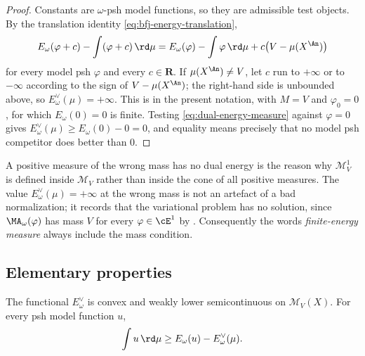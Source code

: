 \begin{proof}
Constants are $\omega$-psh model functions, so they are admissible test
objects.  By the translation identity \eqref{eq:bfj-energy-translation},
\begin{equation}
\label{eq:dual-energy-constant-test}
 E_\omega(\varphi+c)-\int(\varphi+c)\,\rd \mu
 =E_\omega(\varphi)-\int\varphi\,\rd \mu
   +c\bigl(V-\mu(X^{\An})\bigr)
\end{equation}
for every model psh $\varphi$ and every $c\in\mathbf R$.  If
$\mu(X^{\An})\neq V$, let $c$ run to $+\infty$ or to $-\infty$
according to the sign of $V-\mu(X^{\An})$; the right-hand side is
unbounded above, so $E^\vee_\omega(\mu)=+\infty$.  This is
 in the present notation, with $M=V$ and
$\varphi_0=0$, for which $E_\omega(0)=0$ is finite.  Testing
\eqref{eq:dual-energy-measure} against $\varphi=0$ gives
$E^\vee_\omega(\mu)\geq E_\omega(0)-0=0$, and equality means precisely that
no model psh competitor does better than $0$.
\end{proof}

\begin{warning}{A positive measure of the wrong mass has no dual energy}
 is the reason why $\mathcal M^1_V$ is defined
inside $\mathcal M_V$ rather than inside the cone of all positive
measures.  The value $E^\vee_\omega(\mu)=+\infty$ at the wrong mass is not
an artefact of a bad normalization; it records that the variational problem
has no solution, since $\MA_\omega(\varphi)$ has mass $V$ for every
$\varphi\in\cE^1$ by .  Consequently the
words \emph{finite-energy measure} always include the mass condition.
\end{warning}

\subsection{Elementary properties}
\label{sec:ch28-dual-elementary}

\begin{proposition}
\label{prop:dual-energy-elementary}
The functional $E_\omega^\vee$ is convex and weakly lower
semicontinuous on $\mathcal M_V(X)$.  For every psh model function $u$,
\begin{equation}
\label{eq:measure-fenchel-energy}
       \int u\,\rd \mu
       \geq E_\omega(u)-E_\omega^\vee(\mu).
\end{equation}
\end{proposition}

